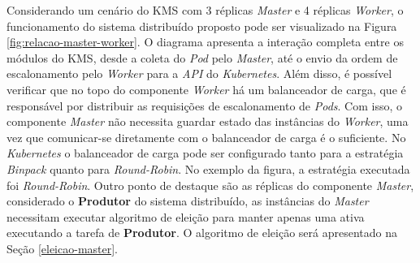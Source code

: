 Considerando um cenário do \ac{KMS} com 3 réplicas \textit{Master} e 4 réplicas \textit{Worker}, o funcionamento do sistema distribuído proposto pode ser visualizado na Figura \ref{fig:relacao-master-worker}. O diagrama apresenta a interação completa entre os módulos do \ac{KMS}, desde a coleta do \textit{Pod} pelo \textit{Master}, até o envio da ordem de escalonamento pelo \textit{Worker} para a \textit{API} do \textit{Kubernetes}. Além disso, é possível verificar que no topo do componente \textit{Worker} há um balanceador de carga, que é responsável por distribuir as requisições de escalonamento de \textit{Pods}. Com isso, o componente \textit{Master} não necessita guardar estado das instâncias do \textit{Worker}, uma vez que comunicar-se diretamente com o balanceador de carga é o suficiente. No \textit{Kubernetes} o balanceador de carga pode ser configurado tanto para a estratégia \textit{Binpack} quanto para \textit{Round-Robin}. No exemplo da figura, a estratégia executada foi \textit{Round-Robin}. Outro ponto de destaque são as réplicas do componente \textit{Master}, considerado o \textbf{Produtor} do sistema distribuído, as instâncias do \textit{Master} necessitam executar algoritmo de eleição para manter apenas uma ativa executando a tarefa de \textbf{Produtor}. O algoritmo de eleição será apresentado na Seção \ref{eleicao-master}.



